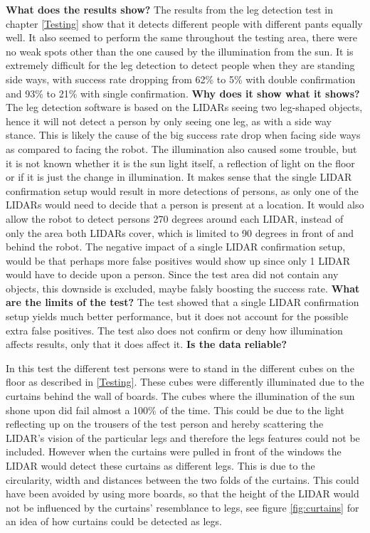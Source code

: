 \textbf{What does the results show?}
The results from the leg detection test in chapter \ref{Testing} show that it detects different people with different pants equally well. It also seemed to perform the same throughout the testing area, there were no weak spots other than the one caused by the illumination from the sun. It is extremely difficult for the leg detection to detect people when they are standing side ways, with success rate dropping from 62\% to 5\% with double confirmation and 93\% to 21\% with single confirmation.
\textbf{Why does it show what it shows?}
The leg detection software is based on the LIDARs seeing two leg-shaped objects, hence it will not detect a person by only seeing one leg, as with a side way stance. This is likely the cause of the big success rate drop when facing side ways as compared to facing the robot. The illumination also caused some trouble, but it is not known whether it is the sun light itself, a reflection of light on the floor or if it is just the change in illumination. It makes sense that the single LIDAR confirmation setup would result in more detections of persons, as only one of the LIDARs would need to decide that a person is present at a location. It would also allow the robot to detect persons 270 degrees around each LIDAR, instead of only the area both LIDARs cover, which is limited to 90 degrees in front of and behind the robot. The negative impact of a single LIDAR confirmation setup, would be that perhaps more false positives would show up since only 1 LIDAR would have to decide upon a person. Since the test area did not contain any objects, this downside is excluded, maybe falsly boosting the success rate.
\textbf{What are the limits of the test?}
The test showed that a single LIDAR confirmation setup yields much better performance, but it does not account for the possible extra false positives. The test also does not confirm or deny how illumination affects results, only that it does affect it.
\textbf{Is the data reliable?}



In this test the different test persons were to stand in the different cubes on the floor as described in \ref{Testing}. These cubes were differently illuminated due to the curtains behind the wall of boards. The cubes where the illumination of the sun shone upon did fail almost a 100\% of the time. This could be due to the light reflecting up on the trousers of the test person and hereby scattering the LIDAR's vision of the particular legs and therefore the legs features could not be included. However when the curtains were pulled in front of the windows the LIDAR would detect these curtains as different legs. This is due to the circularity, width and distances between the two folds of the curtains. This could have been avoided by using more boards, so that the height of the LIDAR would not be influenced by the curtains' resemblance to legs, see figure \ref{fig:curtains} for an idea of how curtains could be detected as legs.\\

